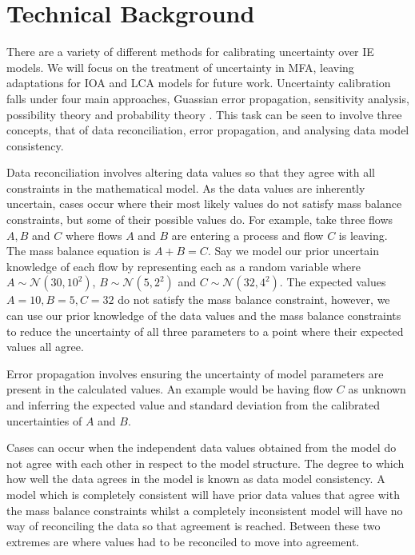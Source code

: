 \documentclass[ %
                    author={Tom Jager},
                supervisor={Dr. Daniel Schien},
                    degree={MEng},
                     title={A Bayesian Inference Engine for Calibrating Uncertainty over UMIS Structured MFA Systems},
                  subtitle={},
                      type={research},
                      year={2019} ]{dissertation}
\begin{document}

\chapter{Technical Background}
\label{chap:technical}
There are a variety of different methods for calibrating uncertainty over IE models. We will focus on the treatment of uncertainty in MFA, leaving adaptations for IOA and LCA models for future work. Uncertainty calibration falls under four main approaches, Guassian error propagation, sensitivity analysis, possibility theory and probability theory \cite{laner2014systematic}. This task can be seen to involve three concepts, that of data reconciliation, error propagation, and analysing data model consistency.

Data reconciliation involves altering data values so that they agree with all constraints in the mathematical model. As the data values are inherently uncertain, cases occur where their most likely values do not satisfy mass balance constraints, but some of their possible values do. For example, take three flows $A, B$ and $C$ where flows $A$ and $B$ are entering a process and flow $C$ is leaving. The mass balance equation is $A + B = C$. Say we model our prior uncertain knowledge of each flow by representing each as a random variable where $A \sim \mathcal{N}(30, 10^2)$, $B \sim \mathcal{N}(5, 2^2)$ and $C \sim \mathcal{N}(32, 4^2)$. The expected values $A = 10, B = 5, C = 32$ do not satisfy the mass balance constraint, however, we can use our prior knowledge of the data values and the mass balance constraints to reduce the uncertainty of all three parameters to a point where their expected values all agree.

Error propagation involves ensuring the uncertainty of model parameters are present in the calculated values. An example would be having flow $C$ as unknown and inferring the expected value and standard deviation from the calibrated uncertainties of $A$ and $B$.

Cases can occur when the independent data values obtained from the model do not agree with each other in respect to the model structure. The degree to which how well the data agrees in the model is known as data model consistency. A model which is completely consistent will have prior data values that agree with the mass balance constraints whilst a completely inconsistent model will have no way of reconciling the data so that agreement is reached. Between these two extremes are where values had to be reconciled to move into agreement.
\end{document}
